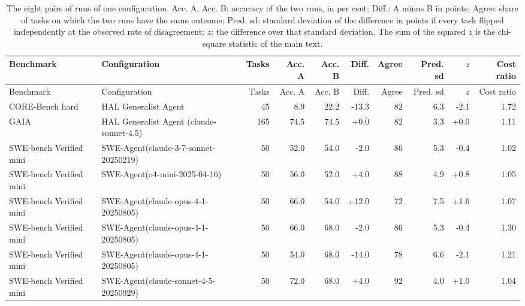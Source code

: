 \begin{longtable}{llrrrrrrrr}
\caption{The eight pairs of runs of one configuration. Acc. A, Acc. B: accuracy of the two runs, in per cent; Diff.: A minus B in points; Agree: share of tasks on which the two runs have the same outcome; Pred. sd: standard deviation of the difference in points if every task flipped independently at the observed rate of disagreement; $z$: the difference over that standard deviation. The sum of the squared $z$ is the chi-square statistic of the main text.}\label{tab:supp-rerun}\\
\toprule
Benchmark & Configuration & Tasks & Acc. A & Acc. B & Diff. & Agree & Pred. sd & $z$ & Cost ratio \\
\midrule
\endfirsthead
\toprule
Benchmark & Configuration & Tasks & Acc. A & Acc. B & Diff. & Agree & Pred. sd & $z$ & Cost ratio \\
\midrule
\endhead
\bottomrule
\endfoot
CORE-Bench hard & HAL Generalist Agent & 45 & 8.9 & 22.2 & -13.3 & 82 & 6.3 & -2.1 & 1.72 \\
GAIA & HAL Generalist Agent (claude-sonnet-4.5) & 165 & 74.5 & 74.5 & +0.0 & 82 & 3.3 & +0.0 & 1.11 \\
SWE-bench Verified mini & SWE-Agent(claude-3-7-sonnet-20250219) & 50 & 52.0 & 54.0 & -2.0 & 86 & 5.3 & -0.4 & 1.02 \\
SWE-bench Verified mini & SWE-Agent(o4-mini-2025-04-16) & 50 & 56.0 & 52.0 & +4.0 & 88 & 4.9 & +0.8 & 1.05 \\
SWE-bench Verified mini & SWE-Agent(claude-opus-4-1-20250805) & 50 & 66.0 & 54.0 & +12.0 & 72 & 7.5 & +1.6 & 1.07 \\
SWE-bench Verified mini & SWE-Agent(claude-opus-4-1-20250805) & 50 & 66.0 & 68.0 & -2.0 & 86 & 5.3 & -0.4 & 1.30 \\
SWE-bench Verified mini & SWE-Agent(claude-opus-4-1-20250805) & 50 & 54.0 & 68.0 & -14.0 & 78 & 6.6 & -2.1 & 1.21 \\
SWE-bench Verified mini & SWE-Agent(claude-sonnet-4-5-20250929) & 50 & 72.0 & 68.0 & +4.0 & 92 & 4.0 & +1.0 & 1.04 \\
\end{longtable}
